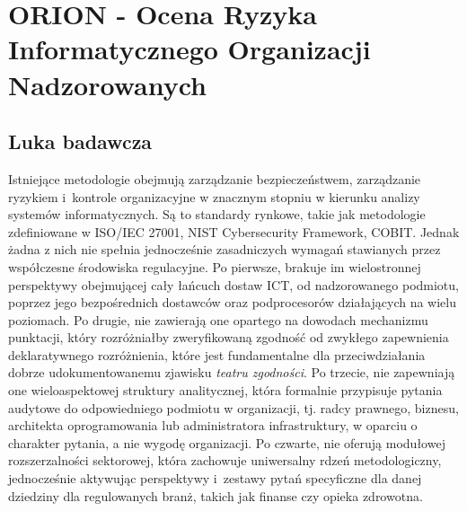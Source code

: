 
\chapter{ORION - Ocena Ryzyka Informatycznego Organizacji Nadzorowanych}

\section{Luka badawcza}
\label{sec:luka}

Istniejące metodologie obejmują zarządzanie bezpieczeństwem, zarządzanie ryzykiem i~kontrole organizacyjne w znacznym stopniu w kierunku analizy systemów informatycznych. Są to standardy rynkowe, takie jak metodologie zdefiniowane w  ISO/IEC 27001, NIST Cybersecurity Framework, COBIT. Jednak żadna z nich nie spełnia jednocześnie  zasadniczych wymagań stawianych przez współczesne środowiska regulacyjne. Po pierwsze, brakuje im wielostronnej perspektywy obejmującej cały łańcuch dostaw ICT, od nadzorowanego podmiotu, poprzez jego bezpośrednich dostawców oraz podprocesorów działających na wielu poziomach. Po drugie, nie zawierają one opartego na dowodach mechanizmu punktacji, który rozróżniałby zweryfikowaną zgodność od zwykłego zapewnienia deklaratywnego rozróżnienia, które jest fundamentalne dla przeciwdziałania dobrze udokumentowanemu zjawisku \textit{teatru zgodności}. Po trzecie, nie zapewniają one wieloaspektowej struktury analitycznej, która formalnie przypisuje pytania audytowe do odpowiedniego podmiotu w organizacji, tj. radcy prawnego, biznesu, architekta oprogramowania lub administratora infrastruktury, w oparciu o charakter pytania, a nie wygodę organizacji. Po czwarte, nie oferują modułowej rozszerzalności sektorowej, która zachowuje uniwersalny rdzeń metodologiczny, jednocześnie aktywując perspektywy i~zestawy pytań specyficzne dla danej dziedziny dla regulowanych branż, takich jak finanse czy opieka zdrowotna.

